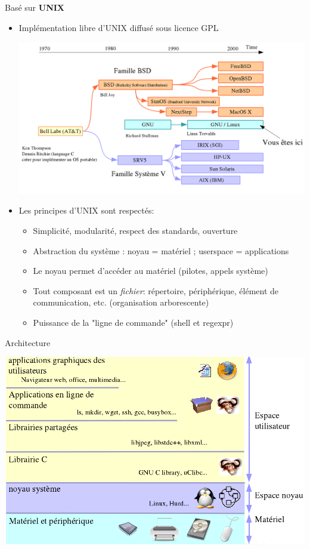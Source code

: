 \begin{frame}{Basé sur \textbf{UNIX}}{}
  \begin{itemize}
  \item Implémentation libre d'UNIX diffusé sous licence GPL
  \begin{center}
    \includegraphics[height=0.4\textheight]{pictures/01_cours_magistral/unix.png}
  \end{center}
  \item Les principes d'UNIX sont respectés:
  \begin{itemize}
  \item Simplicité, modularité, respect des standards, ouverture
  \item Abstraction du système : noyau = matériel ; userspace = applications
  \item Le noyau permet d'accéder au matériel (pilotes, appels système)
  \item Tout composant est un \textit{fichier}: répertoire, périphérique, élément de communication, etc. (organisation arborescente)
  \item Puissance de la "ligne de commande" (shell et regexpr)
  \end{itemize}
  \end{itemize}
\end{frame}

\begin{frame}{Architecture}{}
  \begin{center}
    \includegraphics[height=0.8\textheight]{pictures/01_cours_magistral/architecture-unix.png}
  \end{center}
\end{frame}


